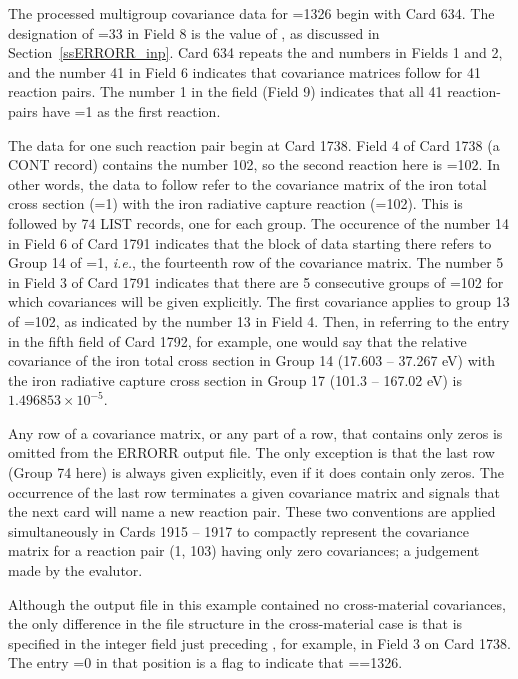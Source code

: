 The processed multigroup covariance data for =1326 begin with
Card 634.  The designation of =33 in Field 8 is the value of
, as discussed in Section~\ref{ssERRORR_inp}.  Card 634 repeats the
 and  numbers in Fields 1 and 2, and the number 41
in Field 6 indicates that covariance matrices follow for 41 reaction pairs.
The number 1 in the  field (Field 9) indicates that all 41
reaction-pairs have =1 as the first reaction.

The data for one such reaction pair begin at Card 1738.  Field 4 of
Card 1738 (a CONT record) contains the number 102, so the second reaction
here is =102.  In other words, the data to follow refer to the
covariance matrix of the iron total cross section (=1) with
the iron radiative capture reaction (=102).  This is followed
by 74 LIST records, one for each group.  The occurence of the number 14
in Field 6 of Card 1791 indicates that the block of data starting there
refers to Group 14 of =1, {\it i.e.}, the fourteenth row of the
covariance matrix.  The number 5 in Field 3 of Card 1791 indicates that
there are 5 consecutive groups of =102 for which covariances
will be given explicitly.  The first covariance applies to group 13 of
=102, as indicated by the number 13 in Field 4.  Then, in
referring to the entry in the fifth field of Card 1792, for example,
one would say that the relative covariance of the iron total cross
section in Group 14 (17.603 -- 37.267 eV) with the iron radiative capture
cross section in Group 17 (101.3 -- 167.02 eV) is $1.496853 \times 10^{-5}$.

Any row of a covariance matrix, or any part of a row, that contains
only zeros is omitted from the ERRORR output file.  The only exception
is that the last row (Group 74 here) is always given explicitly,
even if it does contain only zeros.  The occurrence of the last row
terminates a given covariance matrix and signals that the next
card will name a new reaction pair.  These two conventions are applied
simultaneously in Cards 1915 -- 1917 to compactly represent the
covariance matrix for a reaction pair (1, 103) having only zero
covariances; a judgement made by the evalutor.

Although the output file in this example contained no cross-material
covariances, the only difference in the file structure in the
cross-material case is that  is specified in the integer
field just preceding , for example, in Field 3 on Card
1738.  The entry =0 in that position is a flag to
indicate that ==1326.


